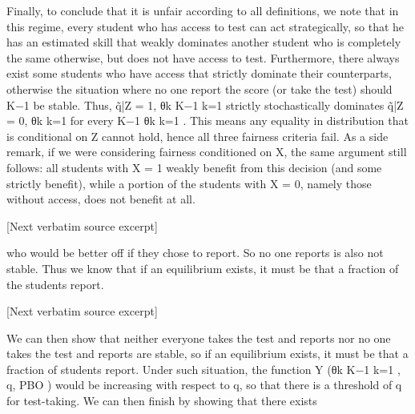 \documentclass[10pt]{article}
\begin{document}
\begin{ReviewVerbatim}

Finally, to conclude that it is unfair according to all definitions, we note that in this regime,
every student who has access to test can act strategically, so that he has an estimated skill that
weakly dominates another student who is completely the same otherwise, but does not have access
to test. Furthermore, there always exist some students who have access that strictly dominate
their counterparts, otherwise the situation where no one report the score (or take the test) should
K−1
be stable. Thus, q̃|Z = 1, {θk }K−1
k=1 strictly stochastically dominates q̃|Z = 0, {θk }k=1 for every
K−1
{θk }k=1 . This means any equality in distribution that is conditional on Z cannot hold, hence all
three fairness criteria fail. As a side remark, if we were considering fairness conditioned on X, the
same argument still follows: all students with X = 1 weakly beneﬁt from this decision (and some
strictly beneﬁt), while a portion of the students with X = 0, namely those without access, does not
beneﬁt at all.

[Next verbatim source excerpt]

who would be better oﬀ if they chose to report. So no one reports is also not stable. Thus we know
that if an equilibrium exists, it must be that a fraction of the students report.

[Next verbatim source excerpt]

We can then show that neither everyone takes the test and reports nor no one takes the test
and reports are stable, so if an equilibrium exists, it must be that a fraction of students report.
Under such situation, the function Y ({θk }K−1
k=1 , q, PBO ) would be increasing with respect to q, so
that there is a threshold of q for test-taking. We can then ﬁnish by showing that there exists
\end{ReviewVerbatim}
\end{document}
